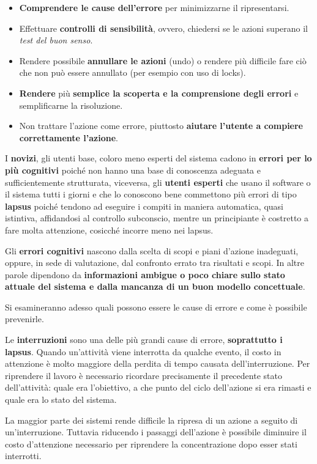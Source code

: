 \documentclass[a4paper,11pt,oneside]{book}
\begin{document}
\begin{itemize}
	\item \textbf{Comprendere le cause dell'errore} per minimizzarne il ripresentarsi.
	\item Effettuare \textbf{controlli di sensibilità}, ovvero, chiedersi se le azioni superano il \textit{test del buon senso}.
	\item Rendere possibile \textbf{annullare le azioni} (undo) o rendere più difficile fare ciò che non può essere annullato (per esempio con uso di locks).
	\item \textbf{Rendere} più \textbf{semplice la scoperta e la comprensione degli errori} e semplificarne la risoluzione.
	\item Non trattare l'azione come errore, piuttosto \textbf{aiutare l'utente a compiere correttamente l'azione}.
\end{itemize}

I \textbf{novizi}, gli utenti base, coloro meno esperti del sistema cadono in \textbf{errori per lo più cognitivi} poiché non hanno una base di conoscenza adeguata e sufficientemente strutturata, viceversa, gli \textbf{utenti esperti} che usano il software o il sistema tutti i giorni e che lo conoscono bene commettono più errori di tipo \textbf{lapsus} poiché tendono ad eseguire i compiti in maniera automatica, quasi istintiva, affidandosi al controllo subconscio, mentre un
principiante è costretto a fare molta attenzione, cosicché incorre meno nei lapsus.

Gli \textbf{errori cognitivi} nascono dalla scelta di scopi e piani d'azione inadeguati, oppure, in sede di valutazione, dal confronto errato tra risultati e scopi. In altre parole dipendono da \textbf{informazioni ambigue o poco chiare sullo stato attuale del sistema e dalla mancanza di un buon modello concettuale}.

Si esamineranno adesso quali possono essere le cause di errore e come è possibile prevenirle.

Le \textbf{interruzioni} sono una delle più grandi cause di errore, \textbf{soprattutto i lapsus}. Quando un'attività viene interrotta da qualche evento, il costo in attenzione è molto maggiore della perdita di tempo causata dell'interruzione. Per riprendere il lavoro è necessario ricordare precisamente il precedente stato dell'attività: quale era l'obiettivo, a che punto del ciclo dell'azione si era rimasti e quale era lo stato del sistema.

La maggior parte dei sistemi rende difficile la ripresa di un azione a seguito di un'interruzione. Tuttavia riducendo i passaggi dell'azione è possibile diminuire il costo d'attenzione necessario per riprendere la concentrazione dopo esser stati interrotti.
\end{document}
